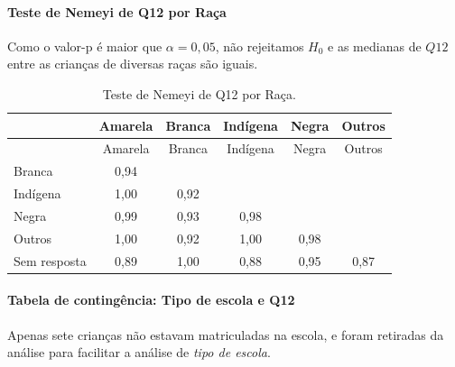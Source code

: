 \documentclass[]{article}
\let\oldparagraph\paragraph
\renewcommand{\paragraph}[1]{\oldparagraph{#1}\mbox{}}
\begin{document}
\hypertarget{teste-de-nemeyi-de-q12-por-rauxe7a}{%
\paragraph{Teste de Nemeyi de Q12 por Raça}\label{teste-de-nemeyi-de-q12-por-rauxe7a}}

Como o valor-p é maior que \(\alpha=0,05\), não rejeitamos \(H_0\) e as medianas de \(Q12\) entre as crianças de diversas raças são iguais.

\begin{longtable}[]{@{}lccccc@{}}
\caption{\label{tab:unnamed-chunk-44}Teste de Nemeyi de Q12 por Raça.}\tabularnewline
\toprule
& Amarela & Branca & Indígena & Negra & Outros\tabularnewline
\midrule
\endfirsthead
\toprule
& Amarela & Branca & Indígena & Negra & Outros\tabularnewline
\midrule
\endhead
Branca & 0,94 & & & &\tabularnewline
Indígena & 1,00 & 0,92 & & &\tabularnewline
Negra & 0,99 & 0,93 & 0,98 & &\tabularnewline
Outros & 1,00 & 0,92 & 1,00 & 0,98 &\tabularnewline
Sem resposta & 0,89 & 1,00 & 0,88 & 0,95 & 0,87\tabularnewline
\bottomrule
\end{longtable}

\cleardoublepage

\hypertarget{tabela-de-continguxeancia-tipo-de-escola-e-q12}{%
\paragraph{Tabela de contingência: Tipo de escola e Q12}\label{tabela-de-continguxeancia-tipo-de-escola-e-q12}}

Apenas sete crianças não estavam matriculadas na escola, e foram retiradas da análise para facilitar a análise de \emph{tipo de escola}.
\end{document}
